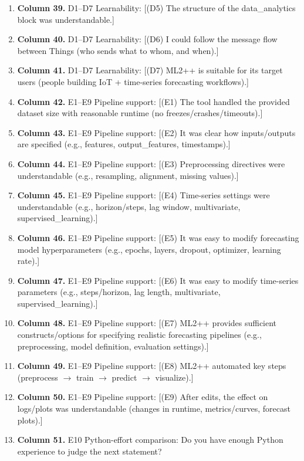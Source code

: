 \begin{enumerate}[leftmargin=*]
    \item \textbf{Column 39.} D1--D7 Learnability: [(D5) The structure of the data\_analytics block was understandable.]
    \item \textbf{Column 40.} D1--D7 Learnability: [(D6) I could follow the message flow between Things (who sends what to whom, and when).]
    \item \textbf{Column 41.} D1--D7 Learnability: [(D7) ML2++ is suitable for its target users (people building IoT + time-series forecasting workflows).]
    \item \textbf{Column 42.} E1--E9 Pipeline support: [(E1) The tool handled the provided dataset size with reasonable runtime (no freezes/crashes/timeouts).]
    \item \textbf{Column 43.} E1--E9 Pipeline support: [(E2) It was clear how inputs/outputs are specified (e.g., features, output\_features, timestamps).]
    \item \textbf{Column 44.} E1--E9 Pipeline support: [(E3) Preprocessing directives were understandable (e.g., resampling, alignment, missing values).]
    \item \textbf{Column 45.} E1--E9 Pipeline support: [(E4) Time-series settings were understandable (e.g., horizon/steps, lag window, multivariate, supervised\_learning).]
    \item \textbf{Column 46.} E1--E9 Pipeline support: [(E5) It was easy to modify forecasting model hyperparameters (e.g., epochs, layers, dropout, optimizer, learning rate).]
    \item \textbf{Column 47.} E1--E9 Pipeline support: [(E6) It was easy to modify time-series parameters (e.g., steps/horizon, lag length, multivariate, supervised\_learning).]
    \item \textbf{Column 48.} E1--E9 Pipeline support: [(E7) ML2++ provides sufficient constructs/options for specifying realistic forecasting pipelines (e.g., preprocessing, model definition, evaluation settings).]
    \item \textbf{Column 49.} E1--E9 Pipeline support: [(E8) ML2++ automated key steps (preprocess \(\rightarrow\) train \(\rightarrow\) predict \(\rightarrow\) visualize).]
    \item \textbf{Column 50.} E1--E9 Pipeline support: [(E9) After edits, the effect on logs/plots was understandable (changes in runtime, metrics/curves, forecast plots).]
    \item \textbf{Column 51.} E10 Python-effort comparison: Do you have enough Python experience to judge the next statement?

\end{enumerate}

